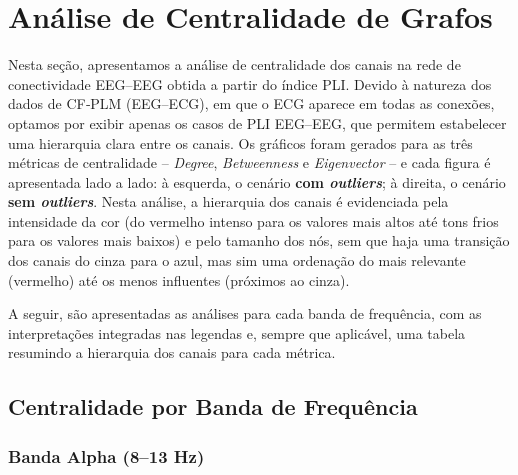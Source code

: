 \chapter{Análise de Centralidade de Grafos}
Nesta seção, apresentamos a análise de centralidade dos canais na rede de conectividade EEG–EEG obtida a partir do índice PLI. Devido à natureza dos dados de CF‐PLM (EEG–ECG), em que o ECG aparece em todas as conexões, optamos por exibir apenas os casos de PLI EEG–EEG, que permitem estabelecer uma hierarquia clara entre os canais. Os gráficos foram gerados para as três métricas de centralidade – \textit{Degree}, \textit{Betweenness} e \textit{Eigenvector} – e cada figura é apresentada lado a lado: à esquerda, o cenário \textbf{com \textit{outliers}}; à direita, o cenário \textbf{sem \textit{outliers}}. Nesta análise, a hierarquia dos canais é evidenciada pela intensidade da cor (do vermelho intenso para os valores mais altos até tons frios para os valores mais baixos) e pelo tamanho dos nós, sem que haja uma transição dos canais do cinza para o azul, mas sim uma ordenação do mais relevante (vermelho) até os menos influentes (próximos ao cinza).

A seguir, são apresentadas as análises para cada banda de frequência, com as interpretações integradas nas legendas e, sempre que aplicável, uma tabela resumindo a hierarquia dos canais para cada métrica.

\section{Centralidade por Banda de Frequência}
\subsection{Banda Alpha (8--13 Hz)}
